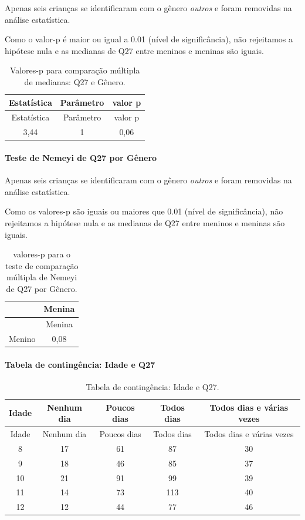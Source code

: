 \documentclass[]{article}
\let\oldparagraph\paragraph
\renewcommand{\paragraph}[1]{\oldparagraph{#1}\mbox{}}
\begin{document}
Apenas seis crianças se identificaram com o gênero \emph{outros} e foram removidas na análise estatística.

Como o valor-p é maior ou igual a 0.01 (nível de significância), não rejeitamos a hipótese nula e as medianas de Q27 entre meninos e meninas são iguais.

\begin{longtable}[]{@{}ccc@{}}
\caption{\label{tab:unnamed-chunk-797}Valores-p para comparação múltipla de medianas: Q27 e Gênero.}\tabularnewline
\toprule
Estatística & Parâmetro & valor p\tabularnewline
\midrule
\endfirsthead
\toprule
Estatística & Parâmetro & valor p\tabularnewline
\midrule
\endhead
3,44 & 1 & 0,06\tabularnewline
\bottomrule
\end{longtable}

\hypertarget{teste-de-nemeyi-de-q27-por-guxeanero}{%
\paragraph{Teste de Nemeyi de Q27 por Gênero}\label{teste-de-nemeyi-de-q27-por-guxeanero}}

Apenas seis crianças se identificaram com o gênero \emph{outros} e foram removidas na análise estatística.

Como os valores-p são iguais ou maiores que 0.01 (nível de significância), não rejeitamos a hipótese nula e as medianas de Q27 entre meninos e meninas são iguais.

\begin{longtable}[]{@{}lc@{}}
\caption{\label{tab:unnamed-chunk-799}valores-p para o teste de comparação múltipla de Nemeyi de Q27 por Gênero.}\tabularnewline
\toprule
& Menina\tabularnewline
\midrule
\endfirsthead
\toprule
& Menina\tabularnewline
\midrule
\endhead
Menino & 0,08\tabularnewline
\bottomrule
\end{longtable}

\cleardoublepage

\hypertarget{tabela-de-continguxeancia-idade-e-q27}{%
\paragraph{Tabela de contingência: Idade e Q27}\label{tabela-de-continguxeancia-idade-e-q27}}

\begin{longtable}[]{@{}ccccc@{}}
\caption{\label{tab:unnamed-chunk-800}Tabela de contingência: Idade e Q27.}\tabularnewline
\toprule
Idade & Nenhum dia & Poucos dias & Todos dias & Todos dias e várias vezes\tabularnewline
\midrule
\endfirsthead
\toprule
Idade & Nenhum dia & Poucos dias & Todos dias & Todos dias e várias vezes\tabularnewline
\midrule
\endhead
8 & 17 & 61 & 87 & 30\tabularnewline
9 & 18 & 46 & 85 & 37\tabularnewline
10 & 21 & 91 & 99 & 39\tabularnewline
11 & 14 & 73 & 113 & 40\tabularnewline
12 & 12 & 44 & 77 & 46\tabularnewline
\bottomrule
\end{longtable}
\end{document}
